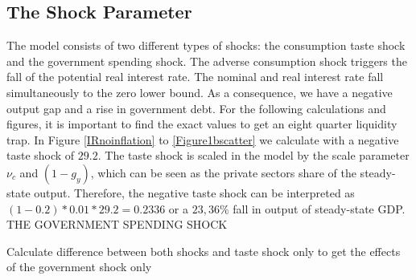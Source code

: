 \documentclass[12pt,a4paper,oneside,titlepage]{article}
\begin{document}
\subsection*{The Shock Parameter}
The model consists of two different types of shocks: the consumption taste shock and the government spending shock. The adverse consumption shock triggers the fall of the potential real interest rate. The nominal and real interest rate fall simultaneously to the zero lower bound. As a consequence, we have a negative output gap and a rise in government debt. For the following calculations and figures, it is important to find the exact values to get an eight quarter liquidity trap. In Figure \ref{IRnoinflation} to \ref{Figure1bscatter} we calculate with a negative taste shock of $29.2$. The taste shock is scaled in the model by the scale parameter $\nu_c$ and $\left(1- g_y\right)$, which can be seen as the private sectors share of the steady-state output. Therefore, the negative taste shock can be interpreted as
$\left(1-0.2\right) * 0.01 * 29.2 = 0.2336$ or a $23,36\%$ fall in output of steady-state GDP.
THE GOVERNMENT SPENDING SHOCK

Calculate difference between both shocks and taste shock only to get the effects of the government shock only
\end{document}
